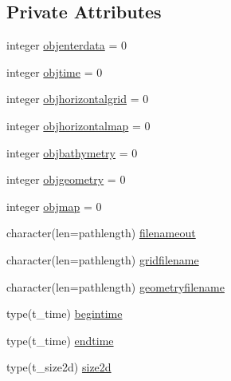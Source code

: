 \subsection*{Private Attributes}
\begin{DoxyCompactItemize}
\item 
integer \mbox{\hyperlink{structmoduleinterpolatetime_1_1t__interpolatetime_ab5202d20be100cc2b3f512e40bb653a5}{objenterdata}} = 0
\item 
integer \mbox{\hyperlink{structmoduleinterpolatetime_1_1t__interpolatetime_ae96a605ecce01804a76792e79a932a01}{objtime}} = 0
\item 
integer \mbox{\hyperlink{structmoduleinterpolatetime_1_1t__interpolatetime_a1cdfcfe2ebc416c71ba240aaeb612731}{objhorizontalgrid}} = 0
\item 
integer \mbox{\hyperlink{structmoduleinterpolatetime_1_1t__interpolatetime_a43a8e13b36c9e4cd9994a1008c65a04e}{objhorizontalmap}} = 0
\item 
integer \mbox{\hyperlink{structmoduleinterpolatetime_1_1t__interpolatetime_a831e02a89974982ac831627759e9f1f3}{objbathymetry}} = 0
\item 
integer \mbox{\hyperlink{structmoduleinterpolatetime_1_1t__interpolatetime_a6b02ff7a2bcf71e6b7db873d6d513a5a}{objgeometry}} = 0
\item 
integer \mbox{\hyperlink{structmoduleinterpolatetime_1_1t__interpolatetime_a8e2e5f3d836cfbecdb1b583c5b1bddb9}{objmap}} = 0
\item 
character(len=pathlength) \mbox{\hyperlink{structmoduleinterpolatetime_1_1t__interpolatetime_a19b801ce338e12f80799daf4c4a14175}{filenameout}}
\item 
character(len=pathlength) \mbox{\hyperlink{structmoduleinterpolatetime_1_1t__interpolatetime_ab304bc0d137f939d66ea1332cafbb5cb}{gridfilename}}
\item 
character(len=pathlength) \mbox{\hyperlink{structmoduleinterpolatetime_1_1t__interpolatetime_a76aa6121bcf46c5c27cffcb809812638}{geometryfilename}}
\item 
type(t\+\_\+time) \mbox{\hyperlink{structmoduleinterpolatetime_1_1t__interpolatetime_a6b9674516bbe6107263c2890b250eb64}{begintime}}
\item 
type(t\+\_\+time) \mbox{\hyperlink{structmoduleinterpolatetime_1_1t__interpolatetime_aea44777a0ea4374fd0408fdd14f92272}{endtime}}
\item 
type(t\+\_\+size2d) \mbox{\hyperlink{structmoduleinterpolatetime_1_1t__interpolatetime_ac37474546c992becd03ef6cdc66a2a47}{size2d}}
\item 

\end{DoxyCompactItemize}
